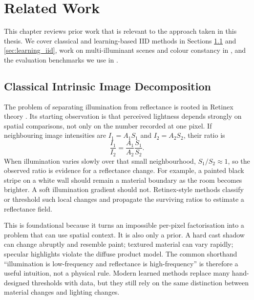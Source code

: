\chapter{Related Work}
\label{ch:related}


This chapter reviews prior work that is relevant to the approach taken in this
thesis.
We cover classical and learning-based IID methods in Sections \ref{sec:classical_iid}
and \ref{sec:learning_iid}, work on multi-illuminant scenes and colour constancy in
, and the evaluation benchmarks we use in .


\section{Classical Intrinsic Image Decomposition}
\label{sec:classical_iid}

The problem of separating illumination from reflectance is rooted in Retinex
theory . Its starting observation is that perceived
lightness depends strongly on spatial comparisons, not only on the number
recorded at one pixel. If neighbouring image intensities are $I_1=A_1S_1$ and
$I_2=A_2S_2$, their ratio is
\begin{equation}
  \frac{I_1}{I_2}=\frac{A_1}{A_2}\frac{S_1}{S_2}.
  \label{eq:retinex_ratio}
\end{equation}
When illumination varies slowly over that small neighbourhood,
$S_1/S_2\approx1$, so the observed ratio is evidence for a reflectance change.
For example, a painted black stripe on a white wall should remain a material
boundary as the room becomes brighter. A soft illumination gradient should not.
Retinex-style methods classify or threshold such local changes and propagate the
surviving ratios to estimate a reflectance field.

This is foundational because it turns an impossible per-pixel factorisation into
a problem that can use spatial context. It is also only a prior. A hard cast
shadow can change abruptly and resemble paint; textured material can vary rapidly;
specular highlights violate the diffuse product model. The common shorthand
``illumination is low-frequency and reflectance is high-frequency'' is therefore
a useful intuition, not a physical rule. Modern learned methods replace many
hand-designed thresholds with data, but they still rely on the same distinction
between material changes and lighting changes.

